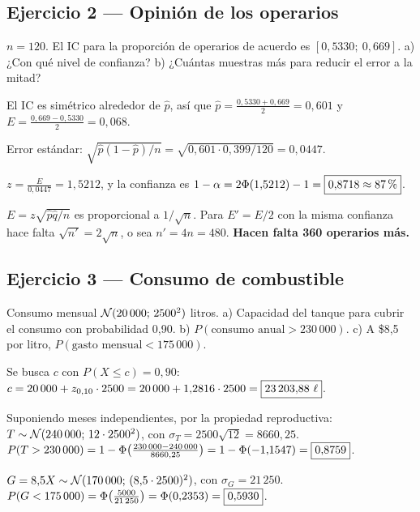\subsection{Ejercicio 2 --- Opinión de los operarios}
\begin{enun}
$n=120$. El IC para la proporción de operarios de acuerdo es $[0{,}5330;\ 0{,}669]$. a) ¿Con qué nivel de confianza? b) ¿Cuántas muestras más para reducir el error a la mitad?
\end{enun}
 El IC es simétrico alrededor de $\hat p$, así que $\hat p=\frac{0{,}5330+0{,}669}{2}=0{,}601$ y $E=\frac{0{,}669-0{,}5330}{2}=0{,}068$.

 Error estándar: $\sqrt{\hat p(1-\hat p)/n}=\sqrt{0{,}601\cdot0{,}399/120}=0{,}0447$.

 $z=\frac{E}{0{,}0447}=1{,}5212$, y la confianza es $1-\alpha=2\Phi(1{,}5212)-1=\boxed{0{,}8718\approx87\,\%}$.

$E=z\sqrt{\hat p\hat q/n}$ es proporcional a $1/\sqrt n$. Para $E'=E/2$ con la misma confianza hace falta $\sqrt{n'}=2\sqrt n$, o sea $n'=4n=480$. \textbf{Hacen falta 360 operarios más.}

\subsection{Ejercicio 3 --- Consumo de combustible}
\begin{enun}
Consumo mensual $\mathcal{N}(20\,000;\,2500^2)$ litros. a) Capacidad del tanque para cubrir el consumo con probabilidad 0,90. b) $P(\text{consumo anual}>230\,000)$. c) A \$8,5 por litro, $P(\text{gasto mensual}<175\,000)$.
\end{enun}
 Se busca $c$ con $P(X\le c)=0{,}90$: $c=20\,000+z_{0,10}\cdot2500=20\,000+1{,}2816\cdot2500=\boxed{23\,203{,}88\ \ell}$.

 Suponiendo meses independientes, por la propiedad reproductiva: $T\sim\mathcal{N}(240\,000;\,12\cdot2500^2)$, con $\sigma_T=2500\sqrt{12}=8660{,}25$.
$P(T>230\,000)=1-\Phi\big(\frac{230\,000-240\,000}{8660{,}25}\big)=1-\Phi(-1{,}1547)=\boxed{0{,}8759}$.

 $G=8{,}5X\sim\mathcal{N}(170\,000;\,(8{,}5\cdot2500)^2)$, con $\sigma_G=21\,250$. $P(G<175\,000)=\Phi\big(\frac{5000}{21\,250}\big)=\Phi(0{,}2353)=\boxed{0{,}5930}$.

